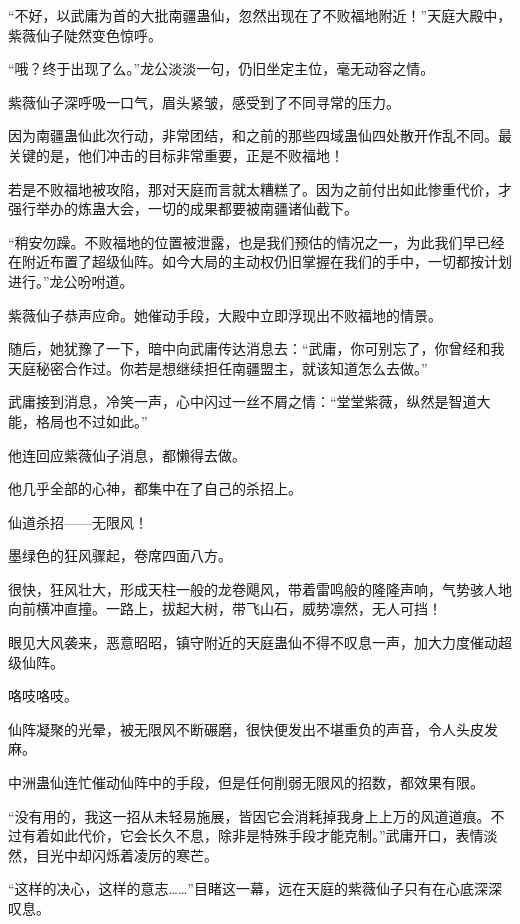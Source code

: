 
\begin{this_body}

“不好，以武庸为首的大批南疆蛊仙，忽然出现在了不败福地附近！”天庭大殿中，紫薇仙子陡然变色惊呼。

“哦？终于出现了么。”龙公淡淡一句，仍旧坐定主位，毫无动容之情。

紫薇仙子深呼吸一口气，眉头紧皱，感受到了不同寻常的压力。

因为南疆蛊仙此次行动，非常团结，和之前的那些四域蛊仙四处散开作乱不同。最关键的是，他们冲击的目标非常重要，正是不败福地！

若是不败福地被攻陷，那对天庭而言就太糟糕了。因为之前付出如此惨重代价，才强行举办的炼蛊大会，一切的成果都要被南疆诸仙截下。

“稍安勿躁。不败福地的位置被泄露，也是我们预估的情况之一，为此我们早已经在附近布置了超级仙阵。如今大局的主动权仍旧掌握在我们的手中，一切都按计划进行。”龙公吩咐道。

紫薇仙子恭声应命。她催动手段，大殿中立即浮现出不败福地的情景。

随后，她犹豫了一下，暗中向武庸传达消息去：“武庸，你可别忘了，你曾经和我天庭秘密合作过。你若是想继续担任南疆盟主，就该知道怎么去做。”

武庸接到消息，冷笑一声，心中闪过一丝不屑之情：“堂堂紫薇，纵然是智道大能，格局也不过如此。”

他连回应紫薇仙子消息，都懒得去做。

他几乎全部的心神，都集中在了自己的杀招上。

仙道杀招——无限风！

墨绿色的狂风骤起，卷席四面八方。

很快，狂风壮大，形成天柱一般的龙卷飓风，带着雷鸣般的隆隆声响，气势骇人地向前横冲直撞。一路上，拔起大树，带飞山石，威势凛然，无人可挡！

眼见大风袭来，恶意昭昭，镇守附近的天庭蛊仙不得不叹息一声，加大力度催动超级仙阵。

咯吱咯吱。

仙阵凝聚的光晕，被无限风不断碾磨，很快便发出不堪重负的声音，令人头皮发麻。

中洲蛊仙连忙催动仙阵中的手段，但是任何削弱无限风的招数，都效果有限。

“没有用的，我这一招从未轻易施展，皆因它会消耗掉我身上上万的风道道痕。不过有着如此代价，它会长久不息，除非是特殊手段才能克制。”武庸开口，表情淡然，目光中却闪烁着凌厉的寒芒。

“这样的决心，这样的意志……”目睹这一幕，远在天庭的紫薇仙子只有在心底深深叹息。


\end{this_body}
